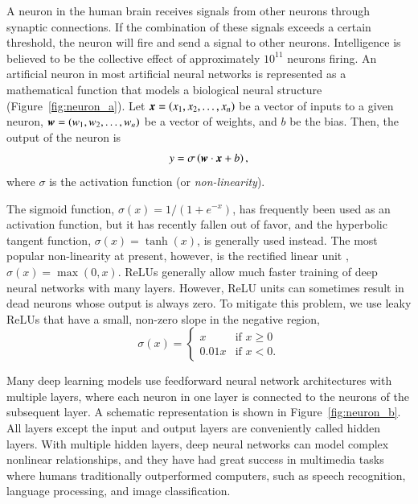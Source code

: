 \documentclass[fleqn,usenatbib]{mnras}
\begin{document}
A neuron in the human brain receives signals from other neurons through
synaptic connections.
If the combination of these signals exceeds a certain threshold,
the neuron will fire and send a signal to other neurons.
Intelligence is believed to be the collective effect of
approximately $10^{11}$ neurons firing.
An artificial neuron in most artificial neural networks is represented
as a mathematical function that models a biological neural structure
(Figure~\ref{fig:neuron_a}).
Let $\bmath{x}=\left(x_1,x_2,\dots,x_n\right)$ be a vector of inputs to a given neuron,
$\bmath{w}=\left(w_1,w_2,\dots,w_n\right)$ be a vector of weights, and
$b$ be the bias.
Then, the output of the neuron is
\begin{equation}
  y = \sigma \left( \bmath{w} \cdot \bmath{x} + b \right),
  \label{eq:neuron_output}
\end{equation}
where $\sigma$ is the activation function (or \textit{non-linearity}).

The sigmoid function, $\sigma(x)=1/\left(1+e^{-x}\right)$,
has frequently been used as an activation function, but it has recently fallen out of favor,
and the hyperbolic tangent function, $\sigma(x)=\tanh(x)$, is generally used instead.
The most popular non-linearity at present, however, is the rectified linear unit
\citep[ReLU;][]{nair2010rectified}, $\sigma(x)=\max(0, x)$.
ReLUs generally allow much faster
training of deep neural networks with many layers.
However, ReLU units can sometimes result in dead neurons whose output is always zero.
To mitigate this problem, we use leaky ReLUs that have a small, non-zero slope
in the negative region,
\begin{equation}
  \sigma(x) =
    \begin{cases}
      x & \mbox{if } x \geq 0 \\
      0.01x & \mbox{if } x < 0.
    \end{cases}
\end{equation}

Many deep learning models use feedforward neural network architectures with multiple layers,
where each neuron in one layer is connected to the neurons of the subsequent layer.
A schematic representation is shown in Figure~\ref{fig:neuron_b}.
All layers except the input and output layers are conveniently called hidden layers.
With multiple hidden layers, deep neural networks can model complex nonlinear
relationships, and they have had great success in multimedia tasks where humans traditionally
outperformed computers, such as speech recognition, language processing, and image classification.
\end{document}
